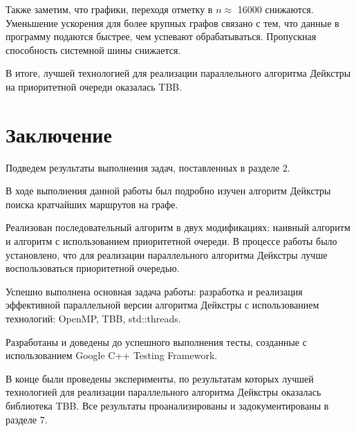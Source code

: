 \documentclass{article}
\begin{document}
\par Также заметим, что графики, переходя отметку в  $n \approx$ 16000 снижаются. Уменьшение ускорения для более крупных графов связано с тем, что данные в программу подаются быстрее, чем успевают обрабатываться. Пропускная способность системной шины снижается. 
\par В итоге, лучшей технологией для реализации параллельного алгоритма Дейкстры на приоритетной очереди оказалась TBB.

\newpage

\section{Заключение}
Подведем результаты выполнения задач, поставленных в разделе 2.

\par В ходе выполнения данной работы был подробно изучен алгоритм Дейкстры поиска кратчайших маршрутов на графе. 

\par Реализован последовательный алгоритм в двух модификациях: наивный алгоритм и алгоритм с использованием приоритетной очереди. В процессе работы было установлено, что для реализации параллельного алгоритма Дейкстры лучше воспользоваться приоритетной очередью.

\par Успешно выполнена основная задача работы: разработка и реализация эффективной параллельной версии алгоритма Дейкстры с использованием технологий: OpenMP, TBB, std::threads.

\par Разработаны и доведены до успешного выполнения тесты, созданные с использованием Google C++ Testing Framework.

\par В конце были проведены эксперименты, по результатам которых  лучшей технологией для реализации параллельного алгоритма Дейкстры оказалась библиотека TBB. Все результаты проанализированы и задокументированы в разделе 7.

\newpage
\end{document}
